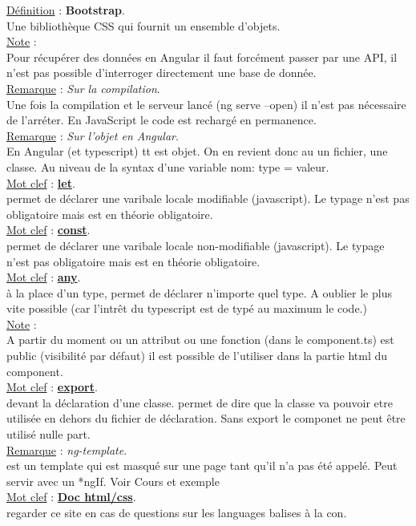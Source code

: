 \documentclass[a4paper,12pt,twoside]{article}
\newcommand{\urlcolor}{magenta}  %
\newcommand{\keycolor}{purple} %
\newcommand{\incode}[1]{{\footnotesize\ttfamily #1}} %
\newcommand{\rem}[2]{\noindent\underline{Remarque} : \textit{#1}.\\ \indent #2}
\newcommand{\note}[1]{\noindent\underline{Note} : \\ \indent #1}
\newcommand{\defi}[2]{\noindent\underline{Définition} : \textbf{#1}.\\ \indent #2}
\newcommand{\keyref}[2]{\hypersetup{urlcolor=\keycolor} \href{#1}{\textbf{#2}}\hypersetup{urlcolor=\urlcolor}}
\newcommand{\keyword}[3]{\noindent\underline{Mot clef} : \keyref{#1}{#2}. \\ \indent #3}
\begin{document}
\defi{Bootstrap}{Une bibliothèque CSS qui fournit un ensemble d'objets.}\\

\note{Pour récupérer des données en Angular il faut forcément passer par une API, il n'est pas possible d'interroger directement une base de donnée.}\\

\rem{Sur la compilation}{Une fois la compilation et le serveur lancé (\incode{ng serve --open}) il n'est pas nécessaire de l'arréter. En JavaScript le code est rechargé en permanence.}\\

\rem{Sur l'objet en Angular}{En Angular (et typescript) tt est objet. On en revient donc au un fichier, une classe. Au niveau de la syntax d'une variable nom: type = valeur.}\\

\keyword{https://developer.mozilla.org/fr/docs/Web/JavaScript/Reference/Statements/let}{let}{permet de déclarer une varibale locale modifiable (javascript). Le typage n'est pas obligatoire mais est en théorie obligatoire.}\\

\keyword{https://developer.mozilla.org/fr/docs/Web/JavaScript/Reference/Statements/const}{const}{permet de déclarer une varibale locale non-modifiable (javascript). Le typage n'est pas obligatoire mais est en théorie obligatoire.}\\

\keyword{}{any}{à la place d'un type, permet de déclarer n'importe quel type. A oublier le plus vite possible (car l'intrêt du typescript est de typé au maximum le code.)}\\

\note{A partir du moment ou un attribut ou une fonction (dans le component.ts) est public (visibilité par défaut) il est possible de l'utiliser dans la partie html du component.}\\

\keyword{}{export}{devant la déclaration d'une classe. permet de dire que la classe va pouvoir etre utilisée en dehors du fichier de déclaration. Sans \incode{export} le componet ne peut être utilisé nulle part.}\\

\rem{ng-template}{est un template qui est masqué sur une page tant qu'il n'a pas été appelé. Peut servir avec un *ngIf. Voir Cours et exemple}\\

\keyword{https://developer.mozilla.org/fr/}{Doc html/css}{regarder ce site en cas de questions sur les languages balises à la con.}\\
\end{document}
